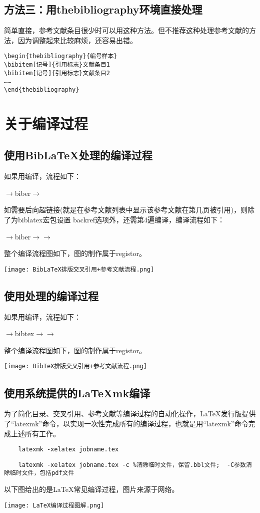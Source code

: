 \documentclass[cn,hazy,blue,14pt,geye,normal,]{elegantnote}
\begin{document}
\subsection{方法三：用thebibliography环境直接处理}
简单直接，参考文献条目很少时可以用这种方法。但不推荐这种处理参考文献的方法，因为调整起来比较麻烦，还容易出错。
\begin{lstlisting}
\begin{thebibliography}{编号样本}
\bibitem[记号]{引用标志}文献条目1
\bibitem[记号]{引用标志}文献条目2
……
\end{thebibliography}
\end{lstlisting}
\section{关于编译过程}
\subsection{使用Bib\LaTeX{}处理的编译过程}
如果用\XeLaTeX{}编译，流程如下：\par
\XeLaTeX\(\to\)biber\(\to\)\XeLaTeX\par
如需要后向超链接(就是在参考文献列表中显示该参考文献在第几页被引用)，则除了为biblatex宏包设置 backref选项外，还需第4遍\XeLaTeX{}编译，编译流程如下：\par
\XeLaTeX\(\to\)biber\(\to\)\XeLaTeX\(\to\)\XeLaTeX\par
整个编译流程图如下，图的制作属于registor\cite{registor20190923}。\par
\texttt{[image: BibLaTeX排版交叉引用+参考文献流程.png]}
\subsection{使用\BibTeX{}处理的编译过程}
如果用\XeLaTeX{}编译，流程如下：\par
\XeLaTeX\(\to\)bibtex\(\to\)\XeLaTeX\(\to\)\XeLaTeX\par
整个编译流程图如下，图的制作属于registor\cite{registor20190923}。\par
\texttt{[image: BibTeX排版交叉引用+参考文献流程.png]}
\subsection{使用系统提供的\LaTeX{}mk编译}
为了简化目录、交叉引用、参考文献等编译过程的自动化操作，\LaTeX{}发行版提供了``latexmk''命令，以实现一次性完成所有的编译过程，也就是用``latexmk''命令完成上述所有工作。
\begin{example}
	\begin{lstlisting}
	latexmk -xelatex jobname.tex
	\end{lstlisting}
\end{example}
\begin{example}
	\begin{lstlisting}
	latexmk -xelatex jobname.tex -c %清除临时文件，保留.bbl文件;  -C参数清除临时文件，包括pdf文件
	\end{lstlisting}
\end{example}\par
以下图给出的是\LaTeX{}常见编译过程，图片来源于网络。\par
\texttt{[image: LaTeX编译过程图解.png]}
\nocite{*}%
%
\end{document}
